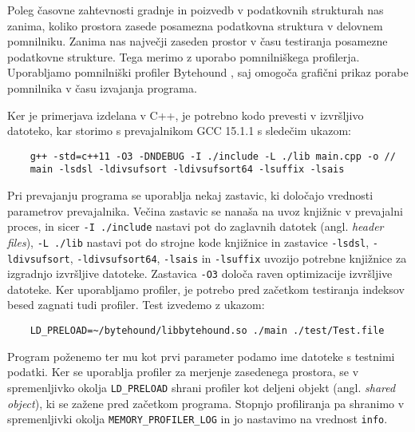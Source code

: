 Poleg časovne zahtevnosti gradnje in poizvedb v podatkovnih strukturah nas zanima, koliko prostora zasede posamezna podatkovna struktura v delovnem pomnilniku. Zanima nas največji zaseden prostor v času testiranja posamezne podatkovne strukture. Tega merimo z uporabo pomnilniškega profilerja. Uporabljamo pomnilniški profiler Bytehound \cite{Bytehound2024}, saj omogoča grafični prikaz porabe pomnilnika v času izvajanja programa.

Ker je primerjava izdelana v C++, je potrebno kodo prevesti v izvršljivo datoteko, kar storimo s prevajalnikom GCC 15.1.1 s sledečim ukazom:
\begin{lstlisting}
    g++ -std=c++11 -O3 -DNDEBUG -I ./include -L ./lib main.cpp -o //
    main -lsdsl -ldivsufsort -ldivsufsort64 -lsuffix -lsais
\end{lstlisting}
Pri prevajanju programa se uporablja nekaj zastavic, ki določajo vrednosti parametrov prevajalnika. Večina zastavic se nanaša na uvoz knjižnic v prevajalni proces, in sicer \verb|-I ./include| nastavi pot do zaglavnih datotek (angl. \textit{header files}), \verb|-L ./lib| nastavi pot do strojne kode knjižnice in zastavice \verb|-lsdsl|, \verb|-ldivsufsort|, \verb|-ldivsufsort64|,  \verb|-lsais| in \verb|-lsuffix| uvozijo potrebne knjižnice za izgradnjo izvršljive datoteke.
Zastavica \verb|-O3| določa raven optimizacije izvršljive datoteke. Ker uporabljamo profiler, je potrebo pred začetkom testiranja indeksov besed zagnati tudi profiler. Test izvedemo z ukazom:
\begin{lstlisting}
    LD_PRELOAD=~/bytehound/libbytehound.so ./main ./test/Test.file 
\end{lstlisting}
Program poženemo ter mu kot prvi parameter podamo ime datoteke s testnimi podatki. Ker se uporablja profiler za merjenje zasedenega prostora, se v spremenljivko okolja \verb|LD_PRELOAD| shrani profiler kot deljeni objekt (angl. \textit{shared object}), ki se zažene pred začetkom programa. Stopnjo profiliranja pa shranimo v spremenljivki okolja \verb|MEMORY_PROFILER_LOG| in jo nastavimo na vrednost \verb|info|.





